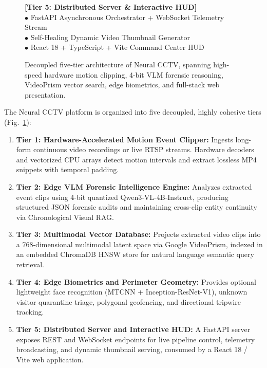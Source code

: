 \documentclass[10pt, conference]{IEEEtran}
\begin{document}
\begin{figure}[!t]
{\begin{minipage}{0.92\columnwidth}
\textbf{[Tier 5: Distributed Server \& Interactive HUD]} \\
$\bullet$ FastAPI Asynchronous Orchestrator + WebSocket Telemetry Stream \\
$\bullet$ Self-Healing Dynamic Video Thumbnail Generator \\
$\bullet$ React 18 + TypeScript + Vite Command Center HUD
\end{minipage}
}
\caption{Decoupled five-tier architecture of Neural CCTV, spanning high-speed hardware motion clipping, 4-bit VLM forensic reasoning, VideoPrism vector search, edge biometrics, and full-stack web presentation.}
\label{fig:architecture}
\end{figure}

The Neural CCTV platform is organized into five decoupled, highly cohesive tiers (Fig.~\ref{fig:architecture}):
\begin{enumerate}
    \item \textbf{Tier 1: Hardware-Accelerated Motion Event Clipper:} Ingests long-form continuous video recordings or live RTSP streams. Hardware decoders and vectorized CPU arrays detect motion intervals and extract lossless MP4 snippets with temporal padding.
    \item \textbf{Tier 2: Edge VLM Forensic Intelligence Engine:} Analyzes extracted event clips using 4-bit quantized Qwen3-VL-4B-Instruct, producing structured JSON forensic audits and maintaining cross-clip entity continuity via Chronological Visual RAG.
    \item \textbf{Tier 3: Multimodal Vector Database:} Projects extracted video clips into a 768-dimensional multimodal latent space via Google VideoPrism, indexed in an embedded ChromaDB HNSW store for natural language semantic query retrieval.
    \item \textbf{Tier 4: Edge Biometrics and Perimeter Geometry:} Provides optional lightweight face recognition (MTCNN + Inception-ResNet-V1), unknown visitor quarantine triage, polygonal geofencing, and directional tripwire tracking.
    \item \textbf{Tier 5: Distributed Server and Interactive HUD:} A FastAPI server exposes REST and WebSocket endpoints for live pipeline control, telemetry broadcasting, and dynamic thumbnail serving, consumed by a React 18 / Vite web application.
\end{enumerate}

\end{document}

